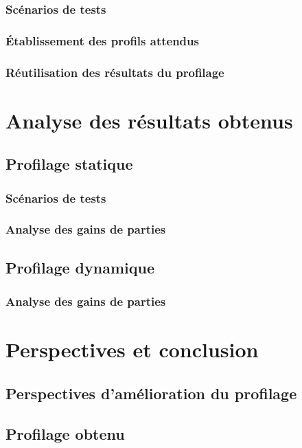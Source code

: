\documentclass{report}
\begin{document}
\subsection{Scénarios de tests}
\subsection{Établissement des profils attendus}
\subsection{Réutilisation des résultats du profilage}


\chapter{Analyse des résultats obtenus}

\section{Profilage statique}
\subsection{Scénarios de tests}
\subsection{Analyse des gains de parties}

\section{Profilage dynamique}
\subsection{Analyse des gains de parties}


\chapter{Perspectives et conclusion}
\section{Perspectives d'amélioration du profilage}
\section{Profilage obtenu}
\end{document}
